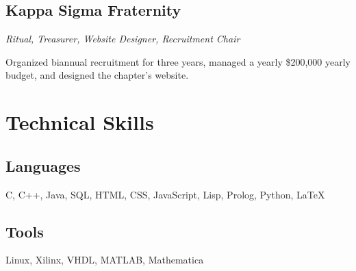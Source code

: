 \documentclass{article}
\begin{document}
\subsection{Kappa Sigma Fraternity}

\textit{Ritual, Treasurer, Website Designer, Recruitment Chair}

Organized biannual recruitment for three years, managed a yearly \$200,000 yearly budget, and designed 
the chapter's website.

\section{Technical Skills}

\subsection{Languages}

C, C++, Java, SQL, HTML, CSS, JavaScript, Lisp, Prolog, Python, \LaTeX

\subsection{Tools}

Linux, Xilinx, VHDL, MATLAB, Mathematica
\end{document}
